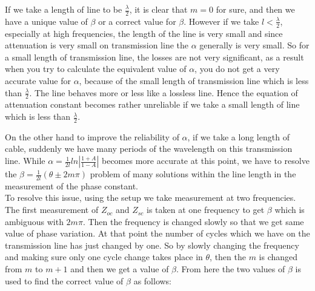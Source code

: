 If we take a length of line to be $\frac{\lambda}{2}$, it is clear that $m = 0$ for sure, and then we have a unique value of $\beta$ or a correct value for $\beta$. However if we take $l < \frac{\lambda}{2}$, especially at high frequencies, the length of the line is very small and since attenuation is very small on transmission line the $\alpha$ generally is very small. So for a small length of transmission line, the losses are not very significant, as a result when you try to calculate the equivalent value of $\alpha$, you do not get a very accurate value for $\alpha$, because of the small length of transmission line which is less than $\frac{\lambda}{2}$. The line behaves more or less like a lossless line. Hence the equation of attenuation constant becomes rather unreliable if we take a small length of line which is less than $\frac{\lambda}{2}$.

On the other hand to improve the reliability of $\alpha$, if we take a long length of cable, suddenly we have many periods of the wavelength on this transmission line. While $\alpha = \frac{1}{2l}ln|\frac{1 + A}{1 - A}|$ becomes more accurate at this point, we have to resolve the $\beta = \frac{1}{2l} (\theta \pm 2m\pi)$ problem of many solutions within the line length in the measurement of the phase constant.\\

To resolve this issue, using the setup we take measurement at two frequencies. The first measurement of $Z_{oc}$ and $Z_{sc}$ is taken at one frequency  to get $\beta$ which is ambiguous with $2m\pi$. Then the frequency is changed slowly so that we get same value of phase variation. At  that point the number of cycles which we have on the transmission line has just changed by one. So by slowly changing the frequency and making sure only one cycle change takes place in $\theta$, then the $m$ is changed from $m$ to $m + 1$ and then we get a value of $\beta$. From here the two values of $\beta$ is used to find the correct value of $\beta$ as  follows:

